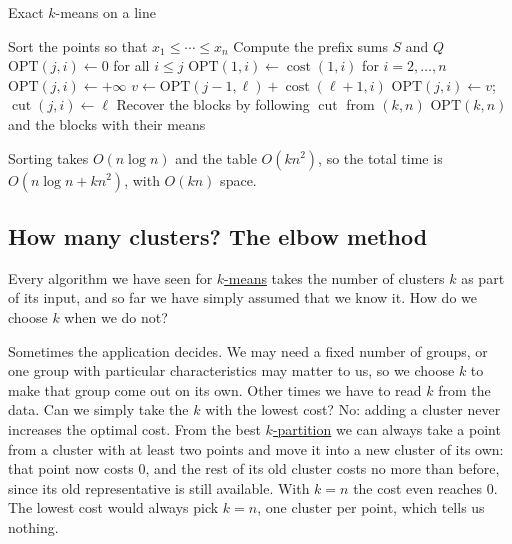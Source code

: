 \documentclass[a4paper,12pt,oneside]{report}
\newcommand{\OPT}{\mathrm{OPT}}
\begin{document}
\begin{framedalgo}{Exact $k$-means on a line}
\label{alg:kmeans-line-dp}
\begin{algorithmic}[1]
    \State Sort the points so that $x_1\leq\cdots\leq x_n$
    \State Compute the prefix sums $S$ and $Q$
    \State $\OPT(j,i)\gets0$ for all $i\leq j$
    \State $\OPT(1,i)\gets\operatorname{cost}(1,i)$ for $i=2,\ldots,n$
        \State $\OPT(j,i)\gets+\infty$
          \State $v\gets\OPT(j-1,\ell)+\operatorname{cost}(\ell+1,i)$
          \If{$v<\OPT(j,i)$}
            \State $\OPT(j,i)\gets v$; $\operatorname{cut}(j,i)\gets\ell$
          \EndIf
        \EndFor
      \EndFor
    \EndFor
    \State Recover the blocks by following $\operatorname{cut}$ from $(k,n)$
    \State \Return $\OPT(k,n)$ and the blocks with their means
  \EndFunction
\end{algorithmic}
\end{framedalgo}

Sorting takes $O(n\log n)$ and the table $O(kn^2)$, so the total time
is $O(n\log n+kn^2)$, with $O(kn)$ space.

\subsection{How many clusters? The elbow method}
\label{sec:elbow-method}

Every algorithm we have seen for \hyperref[prob:k-means]{$k$-means}
takes the number of clusters $k$ as part of its input, and so far we
have simply assumed that we know it. How do we choose $k$ when we do
not?

Sometimes the application decides. We may need a fixed number of
groups, or one group with particular characteristics may matter to us,
so we choose $k$ to make that group come out on its own. Other times
we have to read $k$ from the data. Can we simply take the $k$ with the
lowest cost? No: adding a cluster never increases the optimal cost.
From the best \hyperref[def:k-partition]{$k$-partition} we can always take a point from a cluster with at least two points and move it into a new
cluster of its own: that point now costs $0$, and the rest of its old
cluster costs no more than before, since its old representative is
still available. With $k=n$ the cost even reaches $0$. The lowest cost
would always pick $k=n$, one cluster per point, which tells us nothing.
\end{document}
